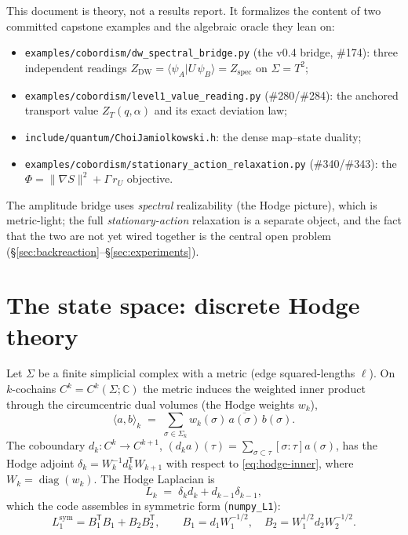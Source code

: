 \documentclass[11pt]{article}
\DeclareMathOperator{\diag}{diag}
\newcommand{\C}{\mathbb{C}}
\newcommand{\braket}[2]{\langle #1 \vert #2 \rangle}
\newcommand{\inner}[2]{\langle #1, #2 \rangle}
\newcommand{\norm}[1]{\lVert #1 \rVert}
\newcommand{\ZT}{Z_{T}}
\newcommand{\Zdw}{Z_{\mathrm{DW}}}
\newcommand{\Zsp}{Z_{\mathrm{spec}}}
\newcommand{\rU}{r_{U}}
\newcommand{\code}[1]{\texttt{#1}}
\theoremstyle{plain}
\theoremstyle{definition}
\begin{document}
This document is theory, not a results report. It formalizes the content of two committed
capstone examples and the algebraic oracle they lean on:
\begin{itemize}[nosep]
  \item \code{examples/cobordism/dw\_spectral\_bridge.py} (the v0.4 bridge, \#174): three
        independent readings $\Zdw=\braket{\psi_A}{U\,\psi_B}=\Zsp$ on $\Sigma=T^2$;
  \item \code{examples/cobordism/level1\_value\_reading.py} (\#280/\#284): the anchored
        transport value $\ZT(q,\alpha)$ and its exact deviation law;
  \item \code{include/quantum/ChoiJamiolkowski.h}: the dense map--state duality;
  \item \code{examples/cobordism/stationary\_action\_relaxation.py} (\#340/\#343): the
        $\Phi=\norm{\nabla S}^2+\Gamma\,\rU$ objective.
\end{itemize}
The amplitude bridge uses \emph{spectral} realizability (the Hodge picture), which is
metric-light; the full \emph{stationary-action} relaxation is a separate object, and the
fact that the two are not yet wired together is the central open problem
(\S\ref{sec:backreaction}--\S\ref{sec:experiments}).

\section{The state space: discrete Hodge theory}
\label{sec:hodge}

Let $\Sigma$ be a finite simplicial complex with a metric (edge squared-lengths $\ell$).
On $k$-cochains $C^k=C^k(\Sigma;\C)$ the metric induces the weighted inner product through
the circumcentric dual volumes (the Hodge weights $w_k$),
\begin{equation}
  \inner{a}{b}_k \;=\; \sum_{\sigma\in\Sigma_k} w_k(\sigma)\,\overline{a(\sigma)}\,b(\sigma).
  \label{eq:hodge-inner}
\end{equation}
The coboundary $d_k:C^k\to C^{k+1}$, $(d_k a)(\tau)=\sum_{\sigma\subset\tau}[\sigma:\tau]a(\sigma)$,
has the Hodge adjoint $\delta_k=W_k^{-1}d_k^{\mathsf T}W_{k+1}$ with respect to
\eqref{eq:hodge-inner}, where $W_k=\diag(w_k)$. The Hodge Laplacian is
\begin{equation}
  L_k \;=\; \delta_k d_k + d_{k-1}\delta_{k-1},
\end{equation}
which the code assembles in symmetric form (\code{numpy\_L1}):
\begin{equation}
  L_1^{\mathrm{sym}} = B_1^{\mathsf T}B_1 + B_2 B_2^{\mathsf T},\qquad
  B_1 = d_1 W_1^{-1/2},\quad B_2 = W_1^{1/2}d_2 W_2^{-1/2}.
\end{equation}
\end{document}
